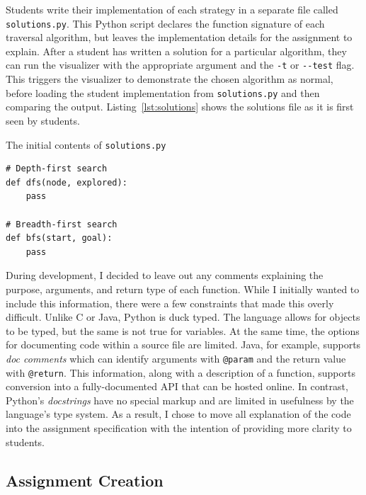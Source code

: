 \documentclass[pageno]{jpaper}
\begin{document}
Students write their implementation of each strategy in a separate file called \texttt{solutions.py}. This Python script declares the function signature of each traversal algorithm, but leaves the implementation details for the assignment to explain. After a student has written a solution for a particular algorithm, they can run the visualizer with the appropriate argument and the \texttt{-t} or \texttt{-{}-test} flag. This triggers the visualizer to demonstrate the chosen algorithm as normal, before loading the student implementation from \texttt{solutions.py} and then comparing the output. Listing~\ref{lst:solutions} shows the solutions file as it is first seen by students.

\begin{listing}[hbt]
\centering
\begin{minipage}{0.8\textwidth}%
\linespread{1.0}
\caption{The initial contents of \texttt{solutions.py}}
\begin{verbatim}
# Depth-first search
def dfs(node, explored):
	pass

# Breadth-first search
def bfs(start, goal):
	pass
\end{verbatim}
\label{lst:solutions}
\end{minipage}
\end{listing}

During development, I decided to leave out any comments explaining the purpose, arguments, and return type of each function. While I initially wanted to include this information, there were a few constraints that made this overly difficult. Unlike C or Java, Python is duck typed. The language allows for objects to be typed, but the same is not true for variables. At the same time, the options for documenting code within a source file are limited. Java, for example, supports \emph{doc comments} which can identify arguments with \texttt{@param} and the return value with \texttt{@return}. This information, along with a description of a function, supports conversion into a fully-documented API that can be hosted online. In contrast, Python's \emph{docstrings} have no special markup and are limited in usefulness by the language's type system. As a result, I chose to move all explanation of the code into the assignment specification with the intention of providing more clarity to students.

\subsection{Assignment Creation}
\end{document}
